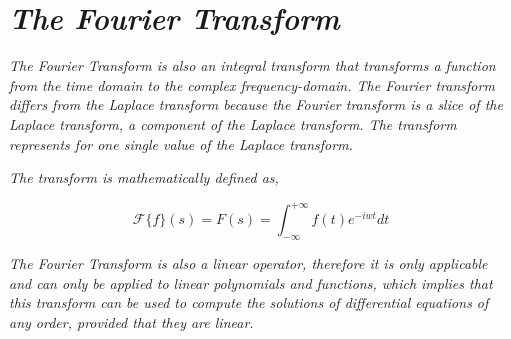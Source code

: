 

\section{\textit{The Fourier Transform}}

	\textit{The Fourier Transform is also an integral transform that transforms a function from the time domain to the complex frequency-domain. The Fourier transform differs from the Laplace transform because the Fourier transform is a slice of the Laplace transform, a component of the Laplace transform. The transform represents for one single value of the Laplace transform.}

	\textit{The transform is mathematically defined as,}

		$$\mathcal{F}\{f\}(s) = F(s) = \int_{-\infty}^{+\infty}f(t)e^{-iwt} dt$$

	\textit{The Fourier Transform is also a linear operator, therefore it is only applicable and can only be applied to linear polynomials and functions, which implies that this transform can be used to compute the solutions of differential equations of any order, provided that they are linear.}


